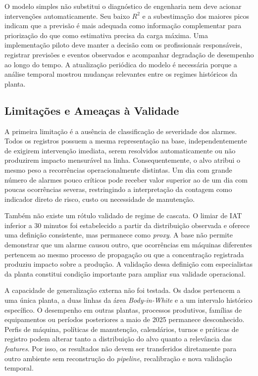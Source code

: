 O modelo simples não substitui o diagnóstico de engenharia nem deve acionar intervenções automaticamente. Seu baixo $R^2$ e a subestimação dos maiores picos indicam que a previsão é mais adequada como informação complementar para priorização do que como estimativa precisa da carga máxima. Uma implementação piloto deve manter a decisão com os profissionais responsáveis, registrar previsões e eventos observados e acompanhar degradação de desempenho ao longo do tempo. A atualização periódica do modelo é necessária porque a análise temporal mostrou mudanças relevantes entre os regimes históricos da planta.

\subsection{Limitações e Ameaças à Validade}

A primeira limitação é a ausência de classificação de severidade dos alarmes. Todos os registros possuem a mesma representação na base, independentemente de exigirem intervenção imediata, serem resolvidos automaticamente ou não produzirem impacto mensurável na linha. Consequentemente, o alvo atribui o mesmo peso a recorrências operacionalmente distintas. Um dia com grande número de alarmes pouco críticos pode receber valor superior ao de um dia com poucas ocorrências severas, restringindo a interpretação da contagem como indicador direto de risco, custo ou necessidade de manutenção.

Também não existe um rótulo validado de regime de cascata. O limiar de IAT inferior a 30 minutos foi estabelecido a partir da distribuição observada e oferece uma definição consistente, mas permanece como \textit{proxy}. A base não permite demonstrar que um alarme causou outro, que ocorrências em máquinas diferentes pertencem ao mesmo processo de propagação ou que a concentração registrada produziu impacto sobre a produção. A validação dessa definição com especialistas da planta constitui condição importante para ampliar sua validade operacional.

A capacidade de generalização externa não foi testada. Os dados pertencem a uma única planta, a duas linhas da área \textit{Body-in-White} e a um intervalo histórico específico. O desempenho em outras plantas, processos produtivos, famílias de equipamentos ou períodos posteriores a maio de 2025 permanece desconhecido. Perfis de máquina, políticas de manutenção, calendários, turnos e práticas de registro podem alterar tanto a distribuição do alvo quanto a relevância das \textit{features}. Por isso, os resultados não devem ser transferidos diretamente para outro ambiente sem reconstrução do \textit{pipeline}, recalibração e nova validação temporal.

